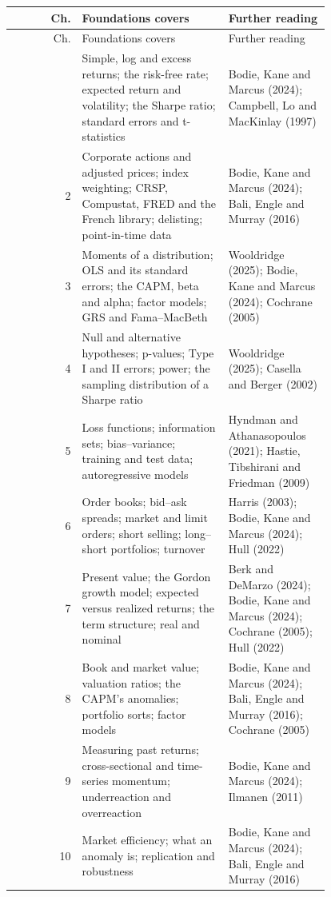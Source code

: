 \begingroup
\small
\setlength{\LTpre}{6pt}\setlength{\LTpost}{6pt}
\begin{longtable}{@{}r>{\raggedright\arraybackslash}p{0.468\linewidth}>{\raggedright\arraybackslash}p{0.324\linewidth}@{}}
\toprule
Ch. & Foundations covers & Further reading \\
\midrule
\endfirsthead
\toprule
Ch. & Foundations covers & Further reading \\
\midrule
\endhead
\bottomrule
\endlastfoot
1 & Simple, log and excess returns; the risk-free rate; expected return and volatility; the Sharpe ratio; standard errors and t-statistics & Bodie, Kane and Marcus (2024); Campbell, Lo and MacKinlay (1997) \\
2 & Corporate actions and adjusted prices; index weighting; CRSP, Compustat, FRED and the French library; delisting; point-in-time data & Bodie, Kane and Marcus (2024); Bali, Engle and Murray (2016) \\
3 & Moments of a distribution; OLS and its standard errors; the CAPM, beta and alpha; factor models; GRS and Fama--MacBeth & Wooldridge (2025); Bodie, Kane and Marcus (2024); Cochrane (2005) \\
4 & Null and alternative hypotheses; p-values; Type I and II errors; power; the sampling distribution of a Sharpe ratio & Wooldridge (2025); Casella and Berger (2002) \\
5 & Loss functions; information sets; bias--variance; training and test data; autoregressive models & Hyndman and Athanasopoulos (2021); Hastie, Tibshirani and Friedman (2009) \\
6 & Order books; bid--ask spreads; market and limit orders; short selling; long--short portfolios; turnover & Harris (2003); Bodie, Kane and Marcus (2024); Hull (2022) \\
7 & Present value; the Gordon growth model; expected versus realized returns; the term structure; real and nominal & Berk and DeMarzo (2024); Bodie, Kane and Marcus (2024); Cochrane (2005); Hull (2022) \\
8 & Book and market value; valuation ratios; the CAPM's anomalies; portfolio sorts; factor models & Bodie, Kane and Marcus (2024); Bali, Engle and Murray (2016); Cochrane (2005) \\
9 & Measuring past returns; cross-sectional and time-series momentum; underreaction and overreaction & Bodie, Kane and Marcus (2024); Ilmanen (2011) \\
10 & Market efficiency; what an anomaly is; replication and robustness & Bodie, Kane and Marcus (2024); Bali, Engle and Murray (2016) \\

\end{longtable}
